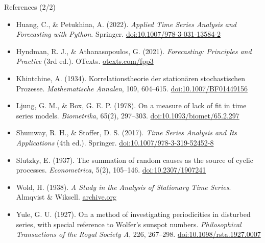 \begin{frame}{References (2/2)}
\itemsize{\scriptsize}
\begin{itemize}
    \item Huang, C., \& Petukhina, A. (2022). \textit{Applied Time Series Analysis and Forecasting with Python}. Springer. \href{https://doi.org/10.1007/978-3-031-13584-2}{doi:10.1007/978-3-031-13584-2}
    \item Hyndman, R. J., \& Athanasopoulos, G. (2021). \textit{Forecasting: Principles and Practice} (3rd ed.). OTexts. \href{https://otexts.com/fpp3/}{otexts.com/fpp3}
    \item Khintchine, A. (1934). Korrelationstheorie der stationären stochastischen Prozesse. \textit{Mathematische Annalen}, 109, 604--615. \href{https://doi.org/10.1007/BF01449156}{doi:10.1007/BF01449156}
    \item Ljung, G. M., \& Box, G. E. P. (1978). On a measure of lack of fit in time series models. \textit{Biometrika}, 65(2), 297--303. \href{https://doi.org/10.1093/biomet/65.2.297}{doi:10.1093/biomet/65.2.297}
    \item Shumway, R. H., \& Stoffer, D. S. (2017). \textit{Time Series Analysis and Its Applications} (4th ed.). Springer. \href{https://doi.org/10.1007/978-3-319-52452-8}{doi:10.1007/978-3-319-52452-8}
    \item Slutzky, E. (1937). The summation of random causes as the source of cyclic processes. \textit{Econometrica}, 5(2), 105--146. \href{https://doi.org/10.2307/1907241}{doi:10.2307/1907241}
    \item Wold, H. (1938). \textit{A Study in the Analysis of Stationary Time Series}. Almqvist \& Wiksell. \href{https://archive.org/details/in.ernet.dli.2015.262214}{archive.org}
    \item Yule, G. U. (1927). On a method of investigating periodicities in disturbed series, with special reference to Wolfer's sunspot numbers. \textit{Philosophical Transactions of the Royal Society A}, 226, 267--298. \href{https://doi.org/10.1098/rsta.1927.0007}{doi:10.1098/rsta.1927.0007}
\end{itemize}
\end{frame}


